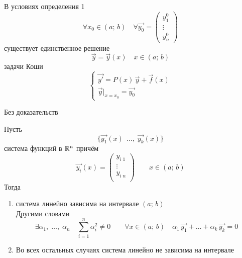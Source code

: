\begin{Th}
    В условиях определения 1
    \[
        \forall x_0 \in (a;\, b) \quad \forall \vec{y_0} = \begin{pmatrix}y^0_1\\ \vdots\\ y^0_n \end{pmatrix}
    \]
    существует единственное решение 
    \[
        \vec{y} = \vec{y}(x) \quad x \in (a;\, b)
    \]
    задачи Коши
    \[
        \begin{cases}   
            \vec{y'} = P(x)\,\vec{y} + \vec{f}(x)\\
            \vec{y}|_{x=x_0} = \vec{y_0}
        \end{cases}
    \]   
\end{Th}

\begin{Proof}
    Без доказательств
\end{Proof}

\begin{Def}
    Пусть
    \[
        \{\vec{y_1}(x)\,\; \dots,\; \vec{y_k}(x)\}
    \]
    система функций в $\mathbb{R}^{n}$ причём 
    \[
        \vec{y_i}(x) = 
        \begin{pmatrix}
            y_{i\;1}\\
            \vdots\\
            y_{i\;n}\\
        \end{pmatrix} \qquad x \in (a;\, b)  
    \]
    Тогда 
    \begin{enumerate}
        \item[\textbullet] система линейно зависима на интервале $(a;\, b)$\\
        Другими словами
        \[
            \exists \alpha_1,\; \dots,\; \alpha_n \quad \sum_{i=1}^{n}\alpha_i^2 \neq 0 \qquad \forall x \in(a;\,b) \quad \alpha_1\,\vec{y_1} + \dots + \alpha_k\,\vec{y_k} = 0
        \]
        
        \item[\textbullet] Во всех остальных случаях система линейно не зависима на интервале
    \end{enumerate}
\end{Def}

